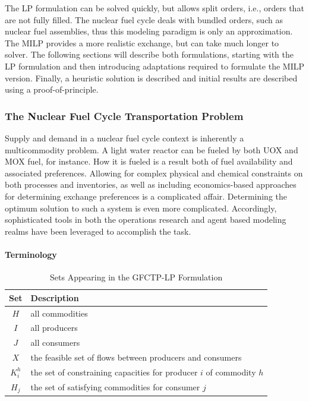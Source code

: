 The LP formulation can be solved quickly, but allows split orders, i.e., orders
that are not fully filled. The nuclear fuel cycle deals with bundled orders,
such as nuclear fuel assemblies, thus this modeling paradigm is only an
approximation. The MILP provides a more realistic exchange, but can take much
longer to solver. The following sections will describe both formulations,
starting with the LP formulation and then introducing adaptations required to
formulate the MILP version. Finally, a heuristic solution is described and
initial results are described using a proof-of-principle.

\subsubsection{The Nuclear Fuel Cycle Transportation Problem}

Supply and demand in a nuclear fuel cycle context is inherently a multicommodity
problem. A light water reactor can be fueled by both UOX and MOX fuel, for
instance. How it is fueled is a result both of fuel availability and associated
preferences. Allowing for complex physical and chemical constraints on both
processes and inventories, as well as including economics-based approaches for
determining exchange preferences is a complicated affair. Determining the
optimum solution to such a system is even more complicated. Accordingly,
sophisticated tools in both the operations research and agent based modeling
realms have been leveraged to accomplish the task.

\paragraph{Terminology}

\begin{table} [h!]
\centering
\begin{tabularx}{\columnwidth-10pt}{|c|X|} %
\hline
Set         & Description \\
\hline
$H$         & all commodities  \\
$I$         & all producers  \\
$J$         & all consumers  \\
$X$         & the feasible set of flows between producers and consumers  \\
$K_{i}^{h}$  & the set of constraining capacities for 
            producer $i$ of commodity $h$  \\
$H_{j}$     & the set of satisfying commodities for consumer $j$  \\
\hline
\end{tabularx}
\caption{Sets Appearing in the GFCTP-LP Formulation}
\label{tbl:GFCTP-LP-sets}
\end{table}

